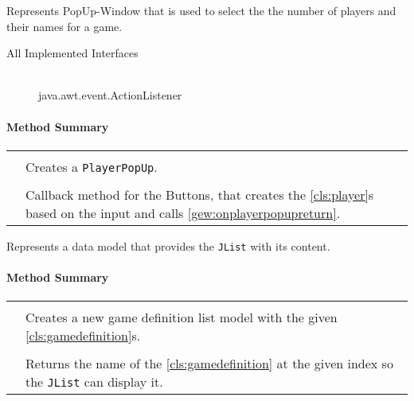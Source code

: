 
Represents PopUp-Window that is used to select the the number of players and their names for a game. \\
\begin{description}
	\item[All Implemented Interfaces] \hfill \\
	java.awt.event.ActionListener
\end{description}

\centerdash

\paragraph*{Method Summary}
\paragraph*{}
\begin{longtable}{Lp{10cm}}
	\startmethodtable
	 \\
	& Creates a \texttt{PlayerPopUp}. \\
	 \\
	& Callback method for the Buttons, that creates the \ref{cls:player}s based on the input and calls \ref{gew:onplayerpopupreturn}. \\
	\hline
\end{longtable}

\pagebreak

Represents a data model that provides the \texttt{JList} with its content. \\

\centerdash

\paragraph*{Method Summary}
\paragraph*{}
\begin{longtable}{Lp{10cm}}
	\startmethodtable
	 \\
	& Creates a new game definition list model with the given \ref{cls:gamedefinition}s. \\
	 \\
	& Returns the name of the \ref{cls:gamedefinition} at the given index so the \texttt{JList} can display it. \\
	\hline
\end{longtable}


